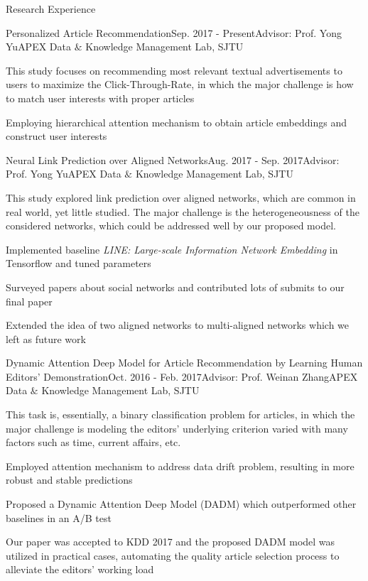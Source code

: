 \documentclass{resume} %
\begin{document}
\begin{rSection}{Research Experience}
\begin{rSubsection}{Personalized Article Recommendation}{Sep. 2017 - Present}{Advisor: Prof. Yong Yu}{APEX Data $\&$ Knowledge Management Lab, SJTU}
\item This study focuses on recommending most relevant textual advertisements to users to maximize the Click-Through-Rate, in which the major challenge is how to match user interests with proper articles
\item Employing hierarchical attention mechanism to obtain article embeddings and construct user interests
\end{rSubsection}
\begin{rSubsection}{Neural Link Prediction over Aligned Networks}{Aug. 2017 - Sep. 2017}{Advisor: Prof. Yong Yu}{APEX Data $\&$ Knowledge Management Lab, SJTU}
\item This study explored link prediction over aligned networks, which are common in real world, yet little studied. The major challenge is the heterogeneousness of the considered networks, which could be addressed well by our proposed model.
\item Implemented baseline \emph{LINE: Large-scale Information Network Embedding} in Tensorflow and tuned parameters
\item Surveyed papers about social networks and contributed lots of submits to our final paper
\item Extended the idea of two aligned networks to multi-aligned networks which we left as future work
\end{rSubsection}
\begin{rSubsection}{Dynamic Attention Deep Model for Article Recommendation
by Learning Human Editors’ Demonstration}{Oct. 2016 - Feb. 2017}{Advisor: Prof. Weinan Zhang}{APEX Data $\&$ Knowledge Management Lab, SJTU}
\item This task is, essentially, a binary classification problem for articles, in which the major challenge is modeling the editors' underlying criterion varied with many factors such as time, current affairs, etc.
\item Employed attention mechanism to address data drift problem, resulting in more robust and stable predictions
\item Proposed a Dynamic Attention Deep Model (DADM) which outperformed other baselines in an A/B test
\item Our paper was accepted to KDD 2017 and the proposed DADM model was utilized in practical cases, automating the quality article selection process to alleviate the editors' working load
\end{rSubsection}
\end{rSection}
\end{document}
